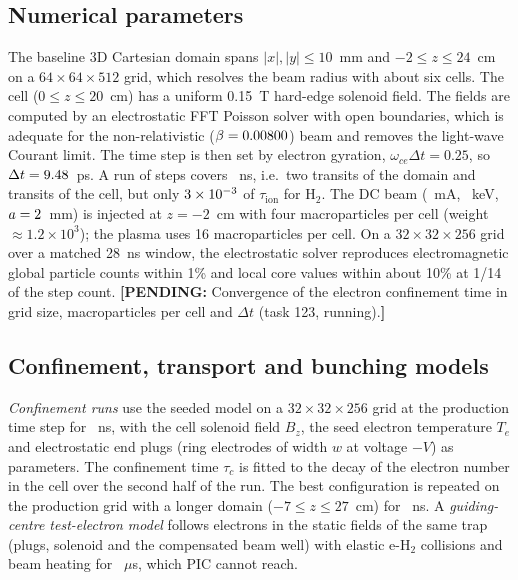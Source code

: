 \documentclass[aps,prab,10pt,twocolumn,superscriptaddress,showpacs,floatfix]{revtex4-2}
\newcommand{\pending}[1]{\textcolor{red!70!black}{\textbf{[PENDING:} #1\textbf{]}}}
\newcommand{\Htwo}{\mathrm{H}_2}
\begin{document}
\subsection{Numerical parameters}

The baseline 3D Cartesian domain spans $|x|,|y|\le10$~mm and $-2\le z\le24$~cm on a
$64\times64\times512$ grid, which resolves the beam radius with about six cells. The cell
($0\le z\le20$~cm) has a uniform 0.15~T hard-edge solenoid field. The fields are computed
by an electrostatic FFT Poisson solver with open boundaries, which is adequate for the
non-relativistic ($\beta=0.00800$) beam and removes the light-wave Courant limit. The
time step is then set by electron gyration, $\omega_{ce}\Delta t=0.25$, so
$\Delta t=9.48$~ps. A run of \numpicsteps{} steps covers \numpicns~ns, i.e.\ two
transits of the domain and \numpicovertransit{} transits of the cell, but only $3\times10^{-3}$
of $\tau_{\mathrm{ion}}$ for $\Htwo$. The DC beam (\numIavgma~mA, \numEkev~keV, $a=2$~mm)
is injected at $z=-2$~cm with four macroparticles per cell (weight $\approx1.2\times10^3$);
the plasma uses 16 macroparticles per cell. On a $32\times32\times256$ grid over a matched
28~ns window, the electrostatic solver reproduces electromagnetic global particle counts
within 1\% and local core values within about 10\% at 1/14 of the step count.
\pending{Convergence of the electron confinement time in grid size, macroparticles per cell
and $\Delta t$ (task 123, running).}

\subsection{Confinement, transport and bunching models}
\label{sec:studymodels}

\emph{Confinement runs} use the seeded model on a $32\times32\times256$ grid at the
production time step for \numstCOtend~ns, with the cell solenoid field $B_z$, the seed
electron temperature $T_e$ and electrostatic end plugs (ring electrodes of width $w$ at
voltage $-V$) as parameters. The confinement time $\tau_c$ is fitted to the decay of the
electron number in the cell over the second half of the run. The best configuration is
repeated on the production grid with a longer domain ($-7\le z\le27$~cm) for
\numstCWtendns~ns. A \emph{guiding-centre test-electron model} follows electrons in the
static fields of the same trap (plugs, solenoid and the compensated beam well) with elastic
e-$\Htwo$ collisions and beam heating for \numstCtwotend~$\mu$s, which PIC cannot reach.
\end{document}

